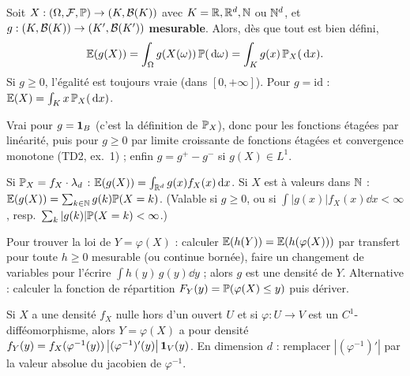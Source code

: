 \documentclass[11pt,a4paper]{article}
\begin{document}
\begin{theoreme}\label{C2:transfert}
Soit $X:(\Omega,\mathcal{F},\mathbb{P})\to(K,\mathcal{B}(K))$ avec $K=\mathbb{R},\mathbb{R}^d,\mathbb{N}$ ou $\mathbb{N}^d$, et $g:(K,\mathcal{B}(K))\to(K',\mathcal{B}(K'))$ \textbf{mesurable}.
Alors, dès que tout est bien défini,
\[\mathbb{E}(g(X))=\int_\Omega g(X(\omega))\,\mathbb{P}(\,\mathrm{d}\omega)=\int_K g(x)\,\mathbb{P}_X(\,\mathrm{d} x).\]
Si $g\ge0$, l'égalité est toujours vraie (dans $[0,+\infty]$). Pour $g=\mathrm{id}$ : $\mathbb{E}(X)=\int_K x\,\mathbb{P}_X(\,\mathrm{d} x)$.
\end{theoreme}
\begin{idee}
Vrai pour $g=\mathbf{1}_B$ (c'est la définition de $\mathbb{P}_X$), donc pour les fonctions étagées par linéarité, puis pour $g\ge0$
par limite croissante de fonctions étagées et convergence monotone (TD2, ex.~1) ; enfin $g=g^+-g^-$ si $g(X)\in L^1$.
\end{idee}

\begin{corollaire}\label{C2:calcul}
Si $\mathbb{P}_X=f_X\cdot\lambda_d$ : $\mathbb{E}(g(X))=\int_{\mathbb{R}^d}g(x)f_X(x)\,\mathrm{d} x$.
Si $X$ est à valeurs dans $\mathbb{N}$ : $\mathbb{E}(g(X))=\sum_{k\in\mathbb{N}}g(k)\mathbb{P}(X=k)$.
(Valable si $g\ge0$, ou si $\int|g(x)|f_X(x)\dd x<\infty$, resp.\ $\sum_k|g(k)|\mathbb{P}(X=k)<\infty$.)
\end{corollaire}

\begin{methode}
Pour trouver la loi de $Y=\varphi(X)$ : calculer $\mathbb{E}(h(Y))=\mathbb{E}(h(\varphi(X)))$ par transfert pour toute $h\ge0$ mesurable
(ou continue bornée), faire un changement de variables pour l'écrire $\int h(y)\,g(y)\dd y$ ; alors $g$ est une densité de $Y$.
Alternative : calculer la fonction de répartition $F_Y(y)=\mathbb{P}(\varphi(X)\le y)$ puis dériver.
\end{methode}

\begin{horscours}\label{C2:chgt-var}
Si $X$ a une densité $f_X$ nulle hors d'un ouvert $U$ et si $\varphi:U\to V$ est un $C^1$-difféomorphisme, alors
$Y=\varphi(X)$ a pour densité $f_Y(y)=f_X(\varphi^{-1}(y))\,\bigl|(\varphi^{-1})'(y)\bigr|\,\mathbf{1}_V(y)$.
En dimension $d$ : remplacer $|(\varphi^{-1})'|$ par la valeur absolue du jacobien de $\varphi^{-1}$.
\end{horscours}
\end{document}
